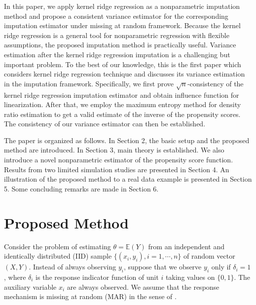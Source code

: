 \documentclass[12pt]{article}
\newcommand{\bx}{{x}}
\begin{document}

In this paper, we apply kernel ridge regression as a nonparametric imputation method and propose a consistent variance estimator for the corresponding imputation estimator under missing at random framework. Because the kernel ridge regression is a general tool for nonparametric regression with flexible assumptions, the proposed imputation method is practically useful. Variance estimation after the kernel ridge regression imputation is a challenging but important problem.   
To the best of our knowledge, this is the first paper which considers kernel ridge regression technique and discusses its variance estimation in the imputation framework.  Specifically, we first prove $\sqrt{n}$-consistency of the kernel ridge regression imputation estimator and obtain influence function for linearization. After that, we 
employ the maximum entropy method \citep{nguyen2010} for density ratio estimation to get a valid estimate of the inverse of the propensity scores. The consistency of our variance estimator can then  be established. 


The paper is organized as follows. In Section 2, the basic setup and  the proposed method are introduced. In Section 3, main theory is established. We also introduce a novel  nonparametric estimator of the propensity score function.  Results from two limited simulation studies are presented in Section 4. An illustration of the proposed method to a real data example is presented in Section 5. Some concluding remarks are made in Section 6. 


\section{Proposed Method}

Consider the problem of estimating $\theta=\mathbb{E}(Y)$ from an independent and identically distributed (IID) sample  $\{(\bx_i, y_i), i=1, \cdots, n\}$ of random {vector} $(X,Y)$. Instead of always {observing  $y_i$}, suppose that we observe $y_i$ only if $\delta_i=1$, where $\delta_i$ is the response indicator function of unit $i$ taking values on $\{0,1\}$.  The auxiliary variable $\bx_i$ are always observed. 
We assume that the response mechanism is missing at random (MAR)   in the sense of   \cite{rubin1976}. 
\end{document}
